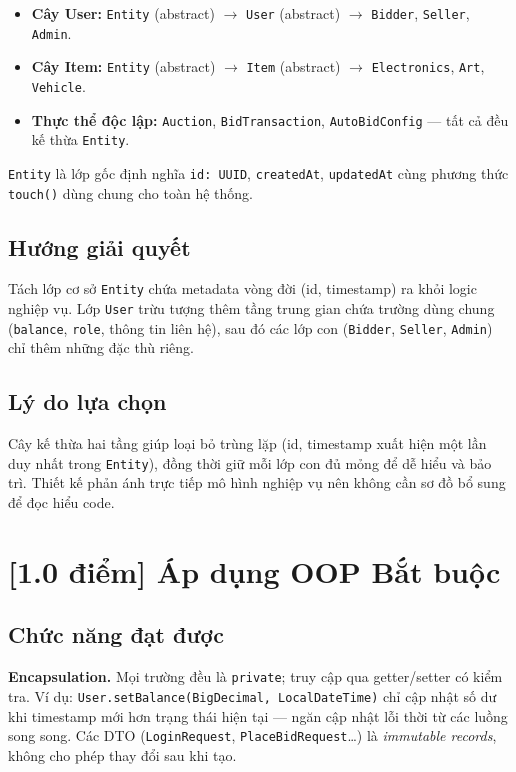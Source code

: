 \documentclass[12pt,a4paper]{article}
\newcommand{\score}[1]{\textbf{[#1 điểm]}}
\newcommand{\mandatory}{\textcolor{mandatorycolor}{\textbf{Bắt buộc}}}
\begin{document}
\begin{itemize}[leftmargin=1.5em]
  \item \textbf{Cây User:} \texttt{Entity} (abstract) $\to$ \texttt{User} (abstract) $\to$ \texttt{Bidder}, \texttt{Seller}, \texttt{Admin}.
  \item \textbf{Cây Item:} \texttt{Entity} (abstract) $\to$ \texttt{Item} (abstract) $\to$ \texttt{Electronics}, \texttt{Art}, \texttt{Vehicle}.
  \item \textbf{Thực thể độc lập:} \texttt{Auction}, \texttt{BidTransaction}, \texttt{AutoBidConfig} — tất cả đều kế thừa \texttt{Entity}.
\end{itemize}

\texttt{Entity} là lớp gốc định nghĩa \texttt{id: UUID}, \texttt{createdAt}, \texttt{updatedAt} cùng phương thức \texttt{touch()} dùng chung cho toàn hệ thống.

\subsection*{Hướng giải quyết}
Tách lớp cơ sở \texttt{Entity} chứa metadata vòng đời (id, timestamp) ra khỏi logic nghiệp vụ. Lớp \texttt{User} trừu tượng thêm tầng trung gian chứa trường dùng chung (\texttt{balance}, \texttt{role}, thông tin liên hệ), sau đó các lớp con (\texttt{Bidder}, \texttt{Seller}, \texttt{Admin}) chỉ thêm những đặc thù riêng.

\subsection*{Lý do lựa chọn}
Cây kế thừa hai tầng giúp loại bỏ trùng lặp (id, timestamp xuất hiện một lần duy nhất trong \texttt{Entity}), đồng thời giữ mỗi lớp con đủ mỏng để dễ hiểu và bảo trì. Thiết kế phản ánh trực tiếp mô hình nghiệp vụ nên không cần sơ đồ bổ sung để đọc hiểu code.

\section{\score{1.0} Áp dụng OOP \hfill \mandatory}

\subsection*{Chức năng đạt được}

\textbf{Encapsulation.}
Mọi trường đều là \texttt{private}; truy cập qua getter/setter có kiểm tra. Ví dụ: \texttt{User.setBalance(BigDecimal, LocalDateTime)} chỉ cập nhật số dư khi timestamp mới hơn trạng thái hiện tại — ngăn cập nhật lỗi thời từ các luồng song song. Các DTO (\texttt{LoginRequest}, \texttt{PlaceBidRequest}…) là \textit{immutable records}, không cho phép thay đổi sau khi tạo.
\end{document}
